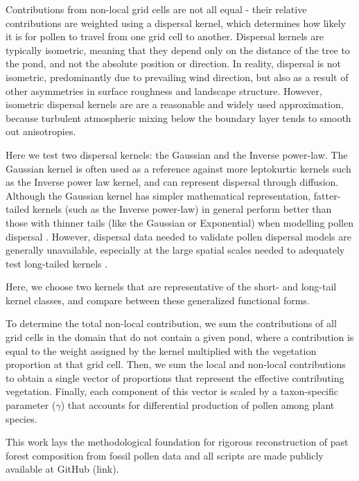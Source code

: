 \documentclass[12pt]{article}
\begin{document}
Contributions from non-local grid cells are not all equal - their
relative contributions are weighted using a dispersal kernel, which
determines how likely it is for pollen to travel from one grid cell to
another. Dispersal kernels are typically isometric, meaning that they
depend only on the distance of the tree to the pond, and not the
absolute position or direction. In reality, dispersal is not
isometric, predominantly due to prevailing wind direction, but also as
a result of other asymmetries in surface roughness and landscape
structure. However, isometric dispersal kernels are are a reasonable
and widely used approximation, because turbulent atmospheric mixing
below the boundary layer tends to smooth out anisotropies.

Here we test two dispersal kernels: the Gaussian and the Inverse
power-law. The Gaussian kernel is often used as a reference against
more leptokurtic kernels such as the Inverse power law kernel, and can
represent dispersal through diffusion. Although the Gaussian kernel
has simpler mathematical representation, fatter-tailed kernels (such
as the Inverse power-law) in general perform better than those with
thinner tails (like the Gaussian or Exponential) when modelling pollen
dispersal \citep{devaux2007modelling, austerlitz2004using}. However,
dispersal data needed to validate pollen dispersal models are
generally unavailable, especially at the large spatial scales needed
to adequately test long-tailed kernels \citep{clobert2012dispersal}.

Here, we choose two kernels that are representative of the short- and
long-tail kernel classes, and compare between these generalized
functional forms.


To determine the total non-local contribution, we sum the
contributions of all grid cells in the domain that do not contain a
given pond, where a contribution is equal to the weight assigned by
the kernel multiplied with the vegetation proportion at that grid
cell. Then, we sum the local and non-local contributions to obtain a
single vector of proportions that represent the effective contributing
vegetation. Finally, each component of this vector is scaled by a
taxon-specific parameter ($\gamma$) that accounts for differential
production of pollen among plant species.

This work lays the methodological foundation for rigorous
reconstruction of past forest composition from fossil pollen data and
all scripts are made publicly available at GitHub (link).
\end{document}
